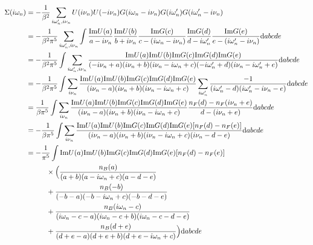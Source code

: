 \documentclass[12pt,a4paper]{scrartcl}
\numberwithin{equation}{section}
\begin{document}
\begin{align}
 \Sigma(i\omega_n)
 &= -\frac{1}{\beta^2}\sum_{i\omega_n',i\nu_n} U(i\nu_n)U(-i\nu_n) G(i\omega_n-i\nu_n)G(i\omega_n')G(i\omega_n'-i\nu_n) \\
 &= -\frac{1}{\beta^2\pi^5}\sum_{i\omega_n',i\nu_n} 
       \int \frac{\mathrm{Im}U(a)}{a-i\nu_n}
            \frac{\mathrm{Im}U(b)}{b+i\nu_n}
            \frac{\mathrm{Im}G(c)}{c-(i\omega_n-i\nu_n)}
            \frac{\mathrm{Im}G(d)}{d-i\omega_n'}
            \frac{\mathrm{Im}G(e)}{e-(i\omega_n'-i\nu_n)} \mathrm{d}abcde\\
%
&= -\frac{1}{\beta^2\pi^5} \int \sum_{i\omega_n',i\nu_n} 
 \frac{\mathrm{Im}U(a)\mathrm{Im}U(b)\mathrm{Im}G(c)\mathrm{Im}G(d)\mathrm{Im}G(e)}
      { (-i\nu_n+a)(i\nu_n+b)( i\nu_n-i\omega_n+c ) (-i\omega_n'+d) (i\nu_n-i\omega_n'+e ) } \mathrm{d}abcde \\
%
&= -\frac{1}{\beta^2\pi^5} \int \sum_{i\nu_n} 
   \frac{\mathrm{Im}U(a)\mathrm{Im}U(b)\mathrm{Im}G(c)\mathrm{Im}G(d)\mathrm{Im}G(e)}{ (i\nu_n-a)(i\nu_n+b)( i\nu_n-i\omega_n+c ) }
    \sum_{i\omega_n'} \frac{-1}{ (i\omega_n'-d)(i\omega_n'-i\nu_n-e ) } \mathrm{d}abcde \\
%
&= \frac{1}{\beta\pi^5} \int \sum_{i\nu_n} 
   \frac{\mathrm{Im}U(a)\mathrm{Im}U(b)\mathrm{Im}G(c)\mathrm{Im}G(d)\mathrm{Im}G(e)}{ (i\nu_n-a)(i\nu_n+b)( i\nu_n-i\omega_n+c ) }
  \frac{n_F(d)-n_F(i\nu_n+e)}{d-(i\nu_n+e)} \mathrm{d}abcde \\
%
%
&= -\frac{1}{\beta\pi^5} \int \sum_{i\nu_n} 
   \frac{\mathrm{Im}U(a)\mathrm{Im}U(b)\mathrm{Im}G(c)\mathrm{Im}G(d)\mathrm{Im}G(e)[n_F(d)-n_F(e)]}
    { (i\nu_n-a)(i\nu_n+b)( i\nu_n-i\omega_n+c )(i\nu_n-d-e) } \mathrm{d}abcde \\%
%
&= -\frac{1}{\pi^5} \int 
   \mathrm{Im}U(a)\mathrm{Im}U(b)\mathrm{Im}G(c)\mathrm{Im}G(d)\mathrm{Im}G(e)[n_F(d)-n_F(e)] \nonumber\\
&\hspace*{1cm} \times \Big( 
                \frac{n_B(a)}{(a+b)( a-i\omega_n+c )(a-d-e) } \nonumber \\
&\hspace*{1cm} +\frac{n_B(-b)}{ (-b-a)( -b-i\omega_n+c )(-b-d-e) } \nonumber \\
&\hspace*{1cm} +\frac{n_B(i\omega_n-c)}{ (i\omega_n-c-a)(i\omega_n-c+b)(i\omega_n-c-d-e) } \nonumber \\
&\hspace*{1cm} +\frac{n_B(d+e)}{ (d+e-a)(d+e+b)( d+e-i\omega_n+c ) } 
    \Big) \mathrm{d}abcde %
\end{align}
\end{document}
